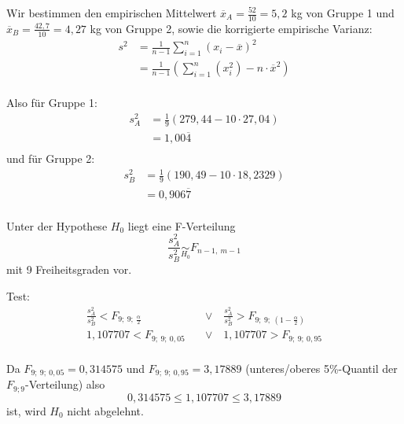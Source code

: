 \documentclass[main.tex]{subfiles}
\begin{document}
Wir bestimmen den empirischen Mittelwert $\overline{x}_A = \frac{52}{10} = 5,2$ kg von Gruppe 1 und $\overline{x}_B = \frac{42,7}{10} = 4,27$ kg von Gruppe 2, sowie die korrigierte empirische Varianz:
$$\begin{aligned}
	s^2 &= \frac{1}{n-1} \sum_{i=1}^n (x_i - \overline{x})^2 \\
	&= \frac{1}{n-1} \left( \sum_{i=1}^n \left( x_i^2 \right) - n \cdot \overline{x}^2 \right) \\
\end{aligned}$$

Also für Gruppe 1:
$$\begin{aligned}
	s_A^2 &= \frac{1}{9} \left( 279,44 - 10 \cdot 27,04 \right) \\
	&= 1,00\overline{4} \\
\end{aligned}$$
und für Gruppe 2:
$$\begin{aligned}
	s_B^2 &= \frac{1}{9} \left( 190,49 - 10 \cdot 18,2329 \right) \\
	&= 0,906\overline{7} \\
\end{aligned}$$

Unter der Hypothese $H_0$ liegt eine F-Verteilung
$$
	\frac{s_A^2}{s_B^2} \underset{H_0}{\sim} F_{n-1,\ m-1}
$$
mit 9 Freiheitsgraden vor.

Test:
$$\begin{aligned}
	\frac{s_A^2}{s_B^2} < F_{9;\ 9;\ \frac{\alpha}{2}}
	\quad &\lor \quad
	\frac{s_A^2}{s_B^2} > F_{9;\ 9;\ \left( 1 - \frac{\alpha}{2}\right)}\\
%
	1,107707 < F_{9;\ 9;\ 0,05}
	\quad &\lor \quad
	1,107707 > F_{9;\ 9;\ 0,95}\\
\end{aligned}$$

Da $F_{9;\ 9;\ 0,05} = 0,314575$ und $F_{9;\ 9;\ 0,95} = 3,17889$ (unteres/oberes 5\%-Quantil der $F_{9;9}$-Verteilung) also
$$
	0,314575 \leq 1,107707 \leq 3,17889
$$
ist, wird $H_0$ nicht abgelehnt.
\end{document}

